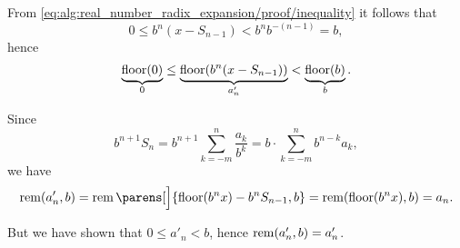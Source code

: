 \begin{defproof}
\begin{itemize}
    From \eqref{eq:alg:real_number_radix_expansion/proof/inequality} it follows that
    \begin{equation*}
      0 \leq b^n (x - S_{n-1}) < b^n b^{-(n-1)} = b,
    \end{equation*}
    hence
    \begin{equation*}
      \underbrace{\operatorname{floor}(0)}_0 \leq \underbrace{\operatorname{floor}(b^n (x - S_{n-1}))}_{a_n'} < \underbrace{\operatorname{floor}(b)}_b.
    \end{equation*}
  \end{itemize}

   Since
  \begin{equation*}
    b^{n+1} S_n
    =
    b^{n+1} \sum_{k=-m}^n \frac {a_k} {b^k}
    =
    b \cdot \sum_{k=-m}^n b^{n-k} a_k,
  \end{equation*}
  we have
  \begin{equation*}
    \rem(a'_n, b)
    =
    \rem\parens[\Big]{ \floor(b^n x) - b^n S_{n-1}, b }
    =
    \rem(\floor(b^n x), b)
    =
    a_n.
  \end{equation*}

  But we have shown that \( 0 \leq a'_n < b \), hence \( \operatorname{rem}(a'_n, b) = a'_n \).
\end{defproof}

